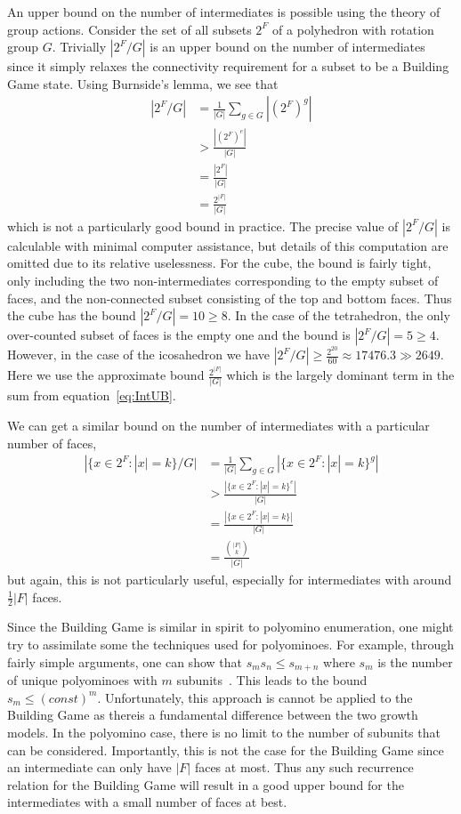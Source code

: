 An upper bound on the number of intermediates is possible using the theory of group actions. Consider the set of all subsets $2^F$ of a polyhedron with rotation group $G$. Trivially $|2^F/G|$ is an upper bound on the number of intermediates since it simply relaxes the connectivity requirement for a subset to be a Building Game state. Using Burnside's lemma, we see that 
\begin{align}
  \label{eq:IntUB}
  |2^F/G| &= \frac{1}{|G|}\sum_{g \in G}|(2^F)^g| \\
  &> \frac{|(2^F)^e|}{|G|} \\
  &= \frac{|2^F|}{|G|} \\
  &= \frac{2^{|F|}}{|G|}
\end{align}
which is not a particularly good bound in practice. The precise value of $|2^F/G|$ is calculable with minimal computer assistance, but details of this computation are omitted due to its relative uselessness. For the cube, the bound is fairly tight, only including the two non-intermediates corresponding to the empty subset of faces, and the non-connected subset consisting of the top and bottom faces. Thus the cube has the bound $|2^F/G| = 10 \geq 8$. In the case of the tetrahedron, the only over-counted subset of faces is the empty one and the bound is $|2^F/G| = 5 \geq 4$. However, in the case of the icosahedron we have $|2^F/G| \geq \frac{2^{20}}{60} \approx 17476.3 \gg 2649$. Here we use the approximate bound $\frac{2^{|F|}}{|G|}$ which is the largely dominant term in the sum from equation~\ref{eq:IntUB}.

We can get a similar bound on the number of intermediates with a particular number of faces,
\begin{align}
  |\{x \in 2^F: |x| = k\} /G| &= \frac{1}{|G|}\sum_{g \in G}|\{x \in 2^F: |x| = k\}^g| \\
  &> \frac{|\{x \in 2^F: |x| = k\}^e|}{|G|} \\
  &= \frac{|\{x \in 2^F: |x| = k\}|}{|G|} \\
  &= \frac{{|F| \choose k}}{|G|}
\end{align}
but again, this is not particularly useful, especially for intermediates with around $\frac{1}{2}|F|$ faces.

Since the Building Game is similar in spirit to polyomino enumeration, one might try to assimilate some the techniques used for polyominoes. For example, through fairly simple arguments, one can show that $s_ms_n \leq s_{m+n}$ where $s_m$ is the number of unique polyominoes with $m$ subunits~\cite{Klarner1973}. This leads to the bound $s_m \leq (const)^m$. Unfortunately, this approach is cannot be applied to the Building Game as thereis a fundamental difference between the two growth models. In the polyomino case, there is no limit to the number of subunits that can be considered. Importantly, this is not the case for the Building Game since an intermediate can only have $|F|$ faces at most. Thus any such recurrence relation for the Building Game will result in a good upper bound for the intermediates with a small number of faces at best.

